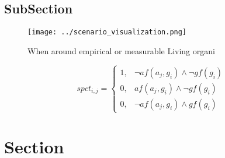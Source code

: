 \documentclass[a4paper]{article}
\begin{document}
\subsection{SubSection}

\begin{figure}
\centering
\texttt{[image: ../scenario\_visualization.png]}
\caption{When around empirical or measurable Living organi
}
\end{figure}
 
\begin{equation}
spct_{i,j} =
\begin{cases}
1, & \text{$\neg af(a_j,g_i) \wedge \neg gf(g_i)$}\\
0, & \text{$af(a_j,g_i) \wedge \neg gf(g_i)$}\\
0, & \text{$\neg af(a_j,g_i) \wedge gf(g_i)$}
\end{cases}
\end{equation}

\section{Section}
\end{document}
